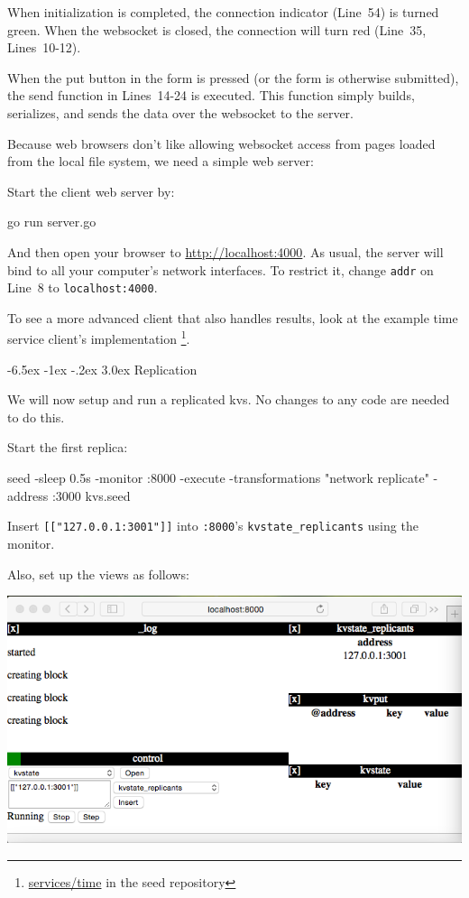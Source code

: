 \documentclass[a5paper,12pt,onecolumn]{article}
\makeatletter
\def\code#1{\mbox{\lstinline{#1}}}
\renewcommand\section{\@startsection {section}{1}{\z@}%
	{-6.5ex \@plus -1ex \@minus -.2ex}%
	{3.0ex}%
	{\sf\Large}}
\makeatother
\begin{document}
When initialization is completed, the connection indicator (Line~54) is turned green. When the websocket is closed, the connection will turn red (Line~35, Lines~10-12).

When the put button in the form is pressed (or the form is otherwise submitted), the send function in Lines~14-24 is executed. This function simply builds, serializes, and sends the data over the websocket to the server.

Because web browsers don't like allowing websocket access from pages loaded from the local file system, we need a simple web server:



Start the client web server by:

\begin{cli}
go run server.go
\end{cli}

And then open your browser to \url{http://localhost:4000}. As usual, the server will bind to all your computer's network interfaces. To restrict it, change \code{addr} on Line~8 to \code{localhost:4000}.

To see a more advanced client that also handles results, look at the example time service client's implementation \footnote{\url{services/time} in the seed repository}.

\section{Replication}

We will now setup and run a replicated kvs. No changes to any code are needed to do this.

Start the first replica:

\begin{cli}
seed -sleep 0.5s -monitor :8000 -execute -transformations "network replicate" -address :3000 kvs.seed
\end{cli}

Insert \code{[["127.0.0.1:3001"]]} into \code{:8000}'s \code{kvstate_replicants} using the monitor.

Also, set up the views as follows:

\includegraphics{replicate/first.png}
\end{document}
